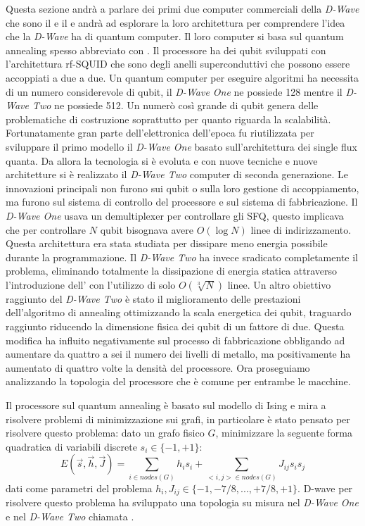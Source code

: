 \cite{ACI}Questa sezione andrà a parlare dei primi due computer commerciali della \textit{D-Wave} che sono il  e il  e andrà ad esplorare la loro architettura per comprendere l'idea che la \textit{D-Wave} ha di quantum computer. Il loro computer si basa sul quantum annealing spesso abbreviato con . Il processore ha dei qubit sviluppati con l'architettura rf-SQUID che sono degli anelli superconduttivi che possono essere accoppiati a due a due. Un quantum computer per eseguire algoritmi ha necessita di un numero considerevole di qubit, il \textit{D-Wave One} ne possiede 128 mentre il \textit{D-Wave Two} ne possiede 512. Un numerò così grande di qubit genera delle problematiche di costruzione soprattutto per quanto riguarda la scalabilità. Fortunatamente gran parte dell'elettronica dell'epoca fu riutilizzata per sviluppare il primo modello il \textit{D-Wave One} basato sull'architettura dei  single flux quanta. Da allora la tecnologia si è evoluta e con nuove tecniche e nuove architetture si è realizzato il \textit{D-Wave Two} computer di seconda generazione. Le innovazioni principali non furono sui qubit o sulla loro gestione di accoppiamento, ma furono sul sistema di controllo del processore e sul sistema di fabbricazione. Il \textit{D-Wave One} usava un demultiplexer per controllare gli SFQ, questo implicava che per controllare $N$ qubit bisognava avere $O(\log{N})$ linee di indirizzamento. Questa architettura era stata studiata per dissipare meno energia possibile durante la programmazione. Il \textit{D-Wave Two} ha invece sradicato completamente il problema, eliminando totalmente la dissipazione di energia statica attraverso l'introduzione dell' con l'utilizzo di solo $O(\sqrt[3]{N})$ linee.
Un altro obiettivo raggiunto del \textit{D-Wave Two} è stato il miglioramento delle prestazioni dell'algoritmo di annealing ottimizzando la scala energetica dei qubit, traguardo raggiunto riducendo la dimensione fisica dei qubit di un fattore di due. Questa modifica ha influito negativamente sul processo di fabbricazione obbligando ad aumentare da quattro a sei il numero dei livelli di metallo, ma positivamente ha aumentato di quattro volte la densità del processore. Ora proseguiamo analizzando la topologia del processore che è comune per entrambe le macchine.

\cite{ACI}Il processore sul quantum annealing è basato sul modello di Ising e mira a risolvere problemi di minimizzazione sui grafi, in particolare è stato pensato per risolvere questo problema: dato un grafo fisico $G$, minimizzare la seguente forma quadratica di variabili discrete $s_i \in \{-1, +1\}$:
$$E(\vec{s}, \vec{h}, \vec{J}) = \sum_{i \in nodes(G)} h_i s_i + \sum_{<i,j> \in nodes(G)} J_{ij} s_i s_j$$
dati come parametri del problema $h_i, J_{ij} \in \{-1, -7/8, ..., +7/8, +1\}$.
D-wave per risolvere questo problema ha sviluppato una topologia su misura nel \textit{D-Wave One} e nel \textit{D-Wave Two} chiamata .

